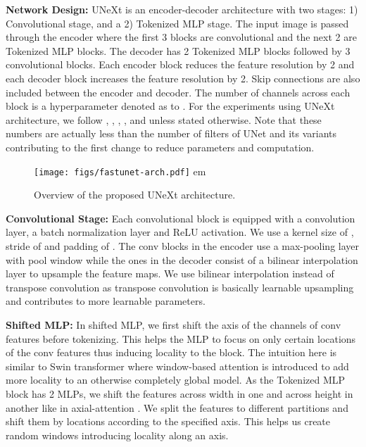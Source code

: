 \documentclass[runningheads]{llncs}
\begin{document}
\noindent \textbf{Network Design:} UNeXt is an encoder-decoder architecture with two stages: 1) Convolutional stage, and a 2) Tokenized MLP stage. The input image is passed through the encoder where the first 3 blocks are convolutional and the next 2 are Tokenized MLP blocks. The decoder has 2 Tokenized MLP blocks followed by 3 convolutional blocks. Each encoder block reduces the feature resolution by 2 and each decoder block increases the feature resolution by 2. Skip connections are also included between the encoder and decoder. The number of channels across each block is a hyperparameter denoted as  to . For the experiments using UNeXt architecture, we follow , , , , and  unless stated otherwise. Note that these numbers are actually less than the number of filters of UNet and its variants contributing to the first change to reduce parameters and computation.



\begin{figure*}[]
	\centering
	\texttt{[image: figs/fastunet-arch.pdf]}
 em
	\caption{Overview of the proposed UNeXt architecture.}    
	\label{arch}

\end{figure*}
\noindent \textbf{Convolutional Stage:} Each convolutional block is equipped with a convolution layer, a batch normalization layer and ReLU activation. We use a kernel size of , stride of  and padding of . The conv blocks in the encoder use a max-pooling layer with pool window  while the ones in the decoder consist of a bilinear interpolation layer to upsample the feature maps. We use bilinear interpolation instead of transpose convolution as transpose convolution is basically learnable upsampling and contributes to more learnable parameters. 


\noindent \textbf{Shifted MLP:} In shifted MLP, we first shift the axis of the channels of conv features before tokenizing. This helps the MLP to focus on only certain locations of the conv features thus inducing locality to the block. The intuition here is similar to Swin transformer \cite{cao2021swin} where window-based attention is introduced to add more locality to an otherwise completely global model. As the Tokenized MLP block has 2 MLPs, we shift the features across width in one and across height in another like in axial-attention \cite{wang2020axial}. We split the features to  different partitions and shift them by  locations according to the specified axis. This helps us create random windows introducing locality along an axis.
\end{document}
